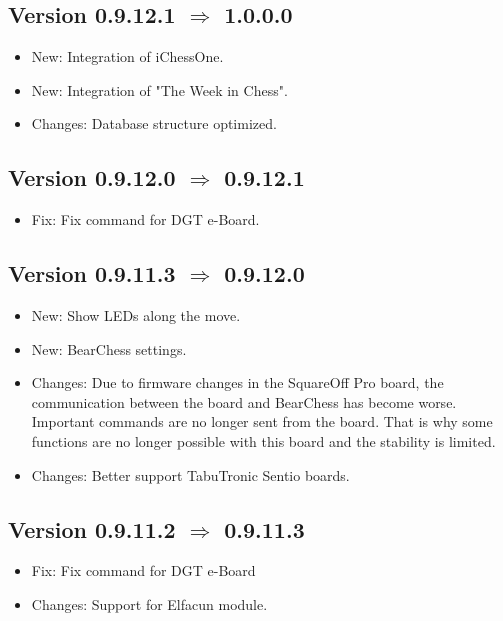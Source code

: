 \documentclass[11pt,a4paper]{article}
\begin{document}
\subsection*{Version 0.9.12.1 $\Rightarrow$  1.0.0.0}
\begin{itemize}	
	\item {\color{blue}New}: Integration of iChessOne.
	\item {\color{blue}New}: Integration of "The Week in Chess".
	\item {\color{teal}Changes}: Database structure optimized.
\end{itemize}

\subsection*{Version 0.9.12.0 $\Rightarrow$  0.9.12.1}
\begin{itemize}	
	\item {\color{red}Fix}: Fix command for DGT e-Board.
\end{itemize}

\subsection*{Version 0.9.11.3 $\Rightarrow$  0.9.12.0}
\begin{itemize}	
	\item {\color{blue}New}: Show LEDs along the move.
	\item {\color{blue}New}: BearChess settings.
	\item {\color{teal}Changes}: Due to firmware changes in the SquareOff Pro board, the communication between the board and BearChess has become worse. Important commands are no longer sent from the board. That is why some functions are no longer possible with this board and the stability is limited.
	\item {\color{teal}Changes}: Better support TabuTronic Sentio boards.
\end{itemize}


\subsection*{Version 0.9.11.2 $\Rightarrow$  0.9.11.3}
\begin{itemize}	
	\item {\color{red}Fix}: Fix command for DGT e-Board
	\item {\color{teal}Changes}: Support for Elfacun module.
\end{itemize}
\end{document}
